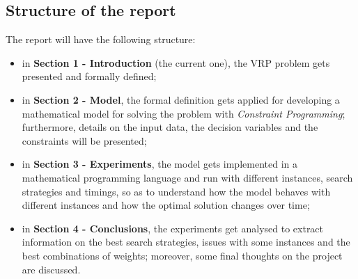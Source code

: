 \documentclass[../main.tex]{subfiles}
\begin{document}
\subsection{Structure of the report}
\label{subsec:structure-report}
The report will have the following structure:
\begin{itemize}
    \item in \textbf{Section 1 - Introduction} (the current one), the VRP problem gets presented and formally defined;
    \item in \textbf{Section 2 - Model}, the formal definition gets applied for developing a mathematical model for solving the problem with \textit{Constraint Programming}; furthermore, details on the input data, the decision variables and the constraints will be presented;
    \item in \textbf{Section 3 - Experiments}, the model gets implemented in a mathematical programming language and run with different instances, search strategies and timings, so as to understand how the model behaves with different instances and how the optimal solution changes over time;
    \item in \textbf{Section 4 - Conclusions}, the experiments get analysed to extract information on the best search strategies, issues with some instances and the best combinations of weights; moreover, some final thoughts on the project are discussed.
\end{itemize}
\end{document}
